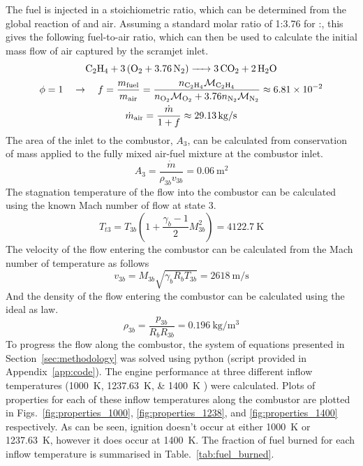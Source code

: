 \documentclass[a4paper]{article}
\begin{document}
The fuel is injected in a stoichiometric ratio, which can be determined from the global reaction of  and air. Assuming a standard molar ratio of 1:3.76 for :, this gives the following fuel-to-air ratio, which can then be used to calculate the initial mass flow of air captured by the scramjet inlet.  
\begin{gather}
    \ce{C2H4 + 3(O2 + 3.76N2) -> 3CO2 + 2H2O} \\
    \phi = 1 \quad \rightarrow 
    \quad f = \frac{m_\text{fuel}}{m_\text{air}} 
    = \frac{
        n_{\ce{C2H4}} \mathcal{M}_{\ce{C2H4}}
    }{
        n_{\ce{O2}} \mathcal{M}_{\ce{O2}} + 3.76 n_{\ce{N2}} \mathcal{M}_{\ce{N2}}
    }
    \approx \num{6.81e-2} \\
    \dot{m}_\text{air} = \frac{\dot{m}}{1 + f} \approx \SI{29.13}{\kg\per\s}
\end{gather}
The area of the inlet to the combustor, \(A_3\), can be calculated from conservation of mass applied to the fully mixed air-fuel mixture at the combustor inlet.
\begin{equation}
    A_3 = \frac{\dot{m}}{\rho_{3b} v_{3b}} = \SI{0.06}{\m\squared}
\end{equation}
The stagnation temperature of the flow into the combustor can be calculated using the known Mach number of flow at state 3.
\begin{equation}
    T_{t3} = T_{3b} \left(1 +\frac{\gamma_b - 1 }{2}M_{3b}^2\right) = \SI{4122.7}{\K}
\end{equation}
The velocity of the flow entering the combustor can be calculated from the Mach number of temperature as follows
\begin{equation}
    v_{3b} = M_{3b} \sqrt{\gamma_b R_b T_{3b}} = \SI{2618}{\m\per\s}
\end{equation}
And the density of the flow entering the combustor can be calculated using the ideal as law.
\begin{equation}
    \rho_{3b} = \frac{p_{3b}}{R_b R_{3b}} = \SI{0.196}{\kg\per\m\cubed}
\end{equation}
To progress the flow along the combustor, the system of equations presented in Section~\ref{sec:methodology} was solved using python (script provided in Appendix~\ref{app:code}). The engine performance at three different inflow temperatures (\SIlist{1000;1237.63;1400}{\K} ) were calculated. Plots of properties for each of these inflow temperatures along the combustor are plotted in Figs.~\ref{fig:properties_1000}, \ref{fig:properties_1238}, and \ref{fig:properties_1400} respectively. As can be seen, ignition doesn't occur at either \SI{1000}{\K} or \SI{1237.63}{\K}, however it does occur at \SI{1400}{\K}. The fraction of fuel burned for each inflow temperature is summarised in Table.~\ref{tab:fuel_burned}.
\end{document}
